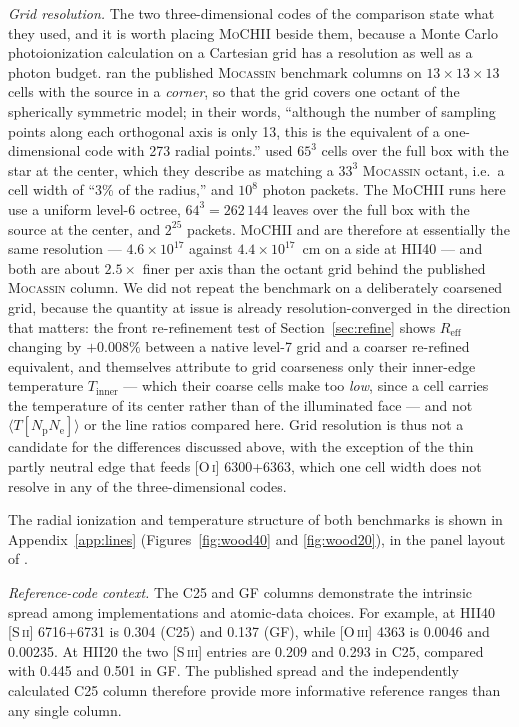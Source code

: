 \documentclass[twocolumn,linenumbers]{aastex702}
\newcommand{\MoCHII}{\textsc{MoCHII}}
\begin{document}
\emph{Grid resolution.}  The two three-dimensional codes of the comparison
state what they used, and it is worth placing \MoCHII{} beside them, because
a Monte Carlo photoionization calculation on a Cartesian grid has a
resolution as well as a photon budget.  \citet{ercolano2003} ran the
published \textsc{Mocassin} benchmark columns on $13\times13\times13$ cells
with the source in a \emph{corner}, so that the grid covers one octant of the
spherically symmetric model; in their words, ``although the number of
sampling points along each orthogonal axis is only 13, this is the
equivalent of a one-dimensional code with 273 radial points.''
\citet{wood2004} used $65^3$ cells over the full box with the star at the
center, which they describe as matching a $33^3$ \textsc{Mocassin} octant,
i.e.\ a cell width of ``3\% of the radius,'' and $10^8$ photon packets.  The
\MoCHII{} runs here use a uniform level-6 octree, $64^3 = 262\,144$ leaves
over the full box with the source at the center, and $2^{25}$ packets.
\MoCHII{} and \citet{wood2004} are therefore at essentially the same
resolution --- $4.6\times10^{17}$ against $4.4\times10^{17}$~cm on a side at
HII40 --- and both are about $2.5\times$ finer per axis than the octant grid
behind the published \textsc{Mocassin} column.  We did not repeat the
benchmark on a deliberately coarsened grid, because the quantity at issue is
already resolution-converged in the direction that matters: the front
re-refinement test of Section~\ref{sec:refine} shows $R_{\mathrm{eff}}$
changing by $+0.008\%$ between a native level-7 grid and a coarser
re-refined equivalent, and \citet{ercolano2003} themselves attribute to grid
coarseness only their inner-edge temperature $T_{\mathrm{inner}}$ --- which
their coarse cells make too \emph{low}, since a cell carries the temperature
of its center rather than of the illuminated face --- and not
$\langle T[N_{\mathrm{p}}N_{\mathrm{e}}]\rangle$ or the line ratios compared
here.  Grid resolution is thus not a candidate for the differences discussed
above, with the exception of the thin partly neutral edge that feeds
[O\,\textsc{i}] 6300+6363, which one cell width does not resolve in any of
the three-dimensional codes.

The radial ionization and temperature structure of both benchmarks is
shown in Appendix~\ref{app:lines} (Figures~\ref{fig:wood40} and
\ref{fig:wood20}), in the panel layout of \citet{wood2004}.


\emph{Reference-code context.}  The C25 and GF columns demonstrate the
intrinsic spread among implementations and atomic-data choices.  For example,
at HII40 [S\,\textsc{ii}] 6716+6731 is 0.304 (C25) and 0.137 (GF), while
[O\,\textsc{iii}] 4363 is 0.0046 and 0.00235.  At HII20 the two
[S\,\textsc{iii}] entries are 0.209 and 0.293 in C25, compared with 0.445
and 0.501 in GF.  The published spread and the independently calculated C25
column therefore provide more informative reference ranges than any single
column.
\end{document}
